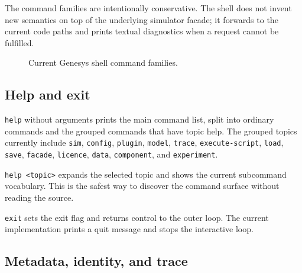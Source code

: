 The command families are intentionally conservative. The shell does not invent
new semantics on top of the underlying simulator facade; it forwards to the
current code paths and prints textual diagnostics when a request cannot be
fulfilled.

\begin{figure}[htbp]
\centering
\caption{Current Genesys shell command families.}
\label{fig:shell-command-flow}
\end{figure}

\subsection{Help and exit}
\label{subsec:shell-help-and-exit}

\texttt{help} without arguments prints the main command list, split into
ordinary commands and the grouped commands that have topic help. The grouped
topics currently include \texttt{sim}, \texttt{config}, \texttt{plugin},
\texttt{model}, \texttt{trace}, \texttt{execute-script}, \texttt{load},
\texttt{save}, \texttt{facade}, \texttt{licence}, \texttt{data},
\texttt{component}, and \texttt{experiment}.

\texttt{help <topic>} expands the selected topic and shows the current
subcommand vocabulary. This is the safest way to discover the command surface
without reading the source.

\texttt{exit} sets the exit flag and returns control to the outer loop. The
current implementation prints a quit message and stops the interactive loop.

\subsection{Metadata, identity, and trace}
\label{subsec:shell-metadata}

